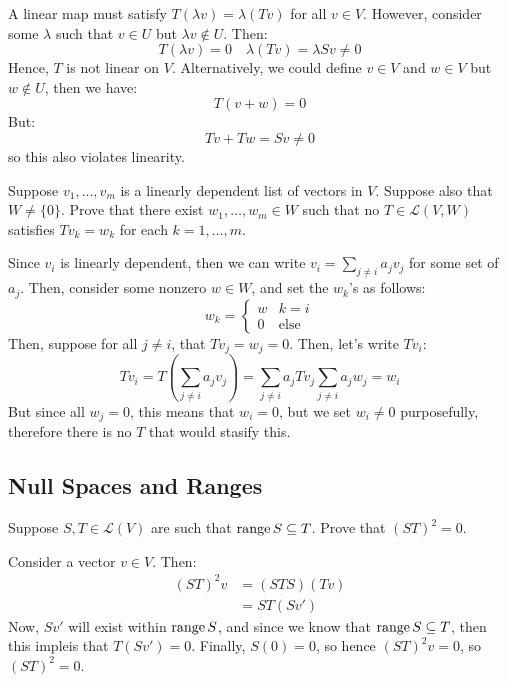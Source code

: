 \documentclass[10pt]{article}
\begin{document}
	\begin{solution}
		A linear map must satisfy \( T(\lambda v) = \lambda (Tv) \)  for all \( v \in V \). However, consider 
		some \( \lambda \) such that \( v \in U \) but \(\lambda v \not\in U \). Then:
		\[
		T(\lambda v) = 0 \quad \lambda (Tv) = \lambda Sv \neq 0 
		\] 
		Hence, \( T \) is not linear on \( V \). Alternatively, we could define \( v \in V \) and \( w \in V \) 
		but \( w \not \in U \), then we have:
		\[
		T(v + w) = 0
		\] 
		But:
		\[
		Tv + Tw = Sv \neq 0
		\] 
		so this also violates linearity.  
	\end{solution}

	\begin{problem}
		Suppose \( v_1, \dots, v_m \) is a linearly dependent list of vectors in \( V \). Suppose also that \( W \neq 
		\{0\} \). Prove that there exist \( w_1, \dots, w_m \in W \) such that no \( T \in \mathcal L(V, W) \) 
		satisfies \( Tv_k = w_k \) for each \( k = 1, \dots, m \). 
	\end{problem}

	\begin{solution}
		Since \( v_i \) is linearly dependent, then we can write \( v_i = \sum_{j \neq i} a_j v_j \) for some 
		set of \( a_j \). Then, consider some nonzero  \( w \in W \), and set the \( w_k \)'s as follows:
		\[
		w_k = \begin{cases}
			w & k = i\\
			0& \text{else}
		\end{cases}
		\] 
		Then, suppose for all \( j \neq i \), that \( Tv_j = w_j = 0\). Then, let's write \( Tv_i \):
		\[
			Tv_i = T\left( \sum_{j \neq i}a_j v_j \right) = \sum_{j \neq i}a_j Tv_j \sum_{j \neq i}a_j w_j = w_i
		\] 
		But since all \( w_j = 0 \), this means that \( w_i = 0 \), but we set \( w_i \neq 0 \) purposefully, 
		therefore there is no \( T \) that would stasify this. 
	\end{solution}
	\subsection{Null Spaces and Ranges}
	\begin{problem}
		Suppose \( S, T \in \mathcal L(V) \) are such that \( \range S \subseteq \null T\). Prove that \( (ST)^2 = 0 \).
	\end{problem}

	\begin{solution}
		Consider a vector \( v \in V \). Then:
		 \begin{align*}
			 (ST)^2 v &= (STS)(Tv) \\
			 &= ST(Sv') 
		\end{align*}
		Now, \( Sv' \) will exist within \( \operatorname*{range} S \), and since we know that \( \range S \subseteq \null T \), 
		then this impleis that \( T(Sv') = 0 \). Finally, \( S(0) = 0 \), so hence \( (ST)^2 v = 0 \), so 
		\( (ST)^2 = 0 \). 
	\end{solution}
\end{document}

